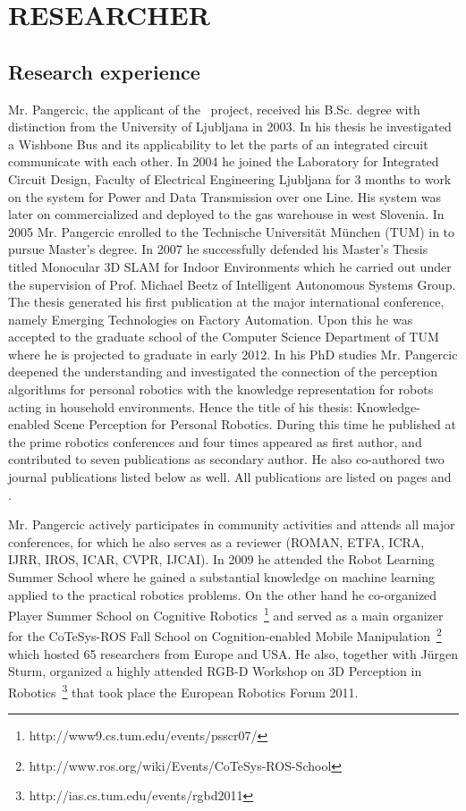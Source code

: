 \section{RESEARCHER} %
\label{sec:researcher}
\subsection{Research experience}
Mr. Pangercic, the applicant of the \ksem\ project, received his B.Sc. degree
with distinction from the University of Ljubljana in 2003. In his thesis he investigated
a Wishbone Bus and its applicability to let the parts of an integrated circuit communicate with each other.
In 2004 he joined the Laboratory for Integrated Circuit Design, Faculty of Electrical Engineering
Ljubljana for 3 months to work on the system for Power and Data Transmission over one Line.
His system was later on commercialized and deployed to the gas warehouse in west Slovenia.
In 2005 Mr. Pangercic enrolled to the Technische Universit\"at M\"unchen (TUM) in to pursue Master's
degree. In 2007 he successfully defended his Master's Thesis titled Monocular 3D SLAM for Indoor Environments
which he carried out under the supervision of Prof. Michael Beetz of Intelligent Autonomous Systems Group.
The thesis generated his first publication at the major international conference, namely
Emerging Technologies on Factory Automation. Upon this he was accepted to the graduate school
of the Computer Science Department of TUM where he is projected to graduate in early 2012.
In his PhD studies Mr. Pangercic deepened the understanding and investigated the connection of the 
perception algorithms for personal robotics with the knowledge representation for robots
acting in household environments. Hence the title of his thesis: Knowledge-enabled Scene Perception for Personal Robotics.
During this time he published at the prime robotics conferences and four times appeared as first author, 
and contributed to seven publications as secondary author. He also co-authored two journal publications listed below as well.
All publications are listed on pages  and .

Mr. Pangercic actively participates in community activities and attends all major conferences, for 
which he also serves as a reviewer (ROMAN, ETFA, ICRA, IJRR, IROS, ICAR, CVPR, IJCAI). In 2009 he 
attended the Robot Learning Summer School where he gained a substantial knowledge on machine learning 
applied to the practical robotics problems. On the other hand he co-organized Player Summer School on 
Cognitive Robotics~\footnote{http://www9.cs.tum.edu/events/psscr07/} and 
served as a main organizer for the CoTeSys-ROS Fall School on Cognition-enabled Mobile 
Manipulation~\footnote{http://www.ros.org/wiki/Events/CoTeSys-ROS-School} which hosted 
65 researchers from Europe and USA. He also, together with J\"urgen Sturm, organized a highly 
attended RGB-D Workshop on 3D Perception in Robotics~\footnote{http://ias.cs.tum.edu/events/rgbd2011} 
that took place the European Robotics Forum 2011.

